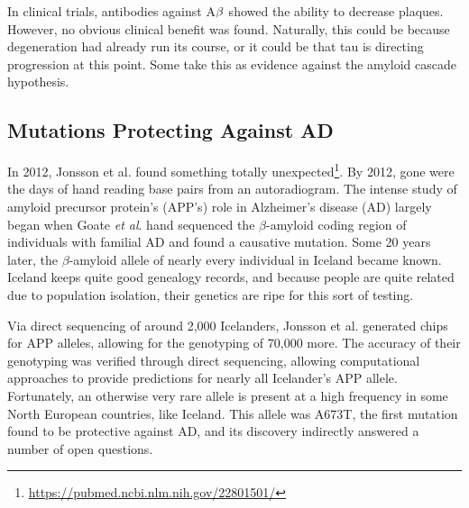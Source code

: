 In clinical trials, antibodies against A$\beta$ showed the ability to decrease plaques. However, no obvious clinical benefit was found. Naturally, this could be because degeneration had already run its course, or it could be that tau is directing progression at this point. Some take this as evidence against the amyloid cascade hypothesis. 


\subsection*{Mutations Protecting Against AD}

 In 2012, Jonsson et al. found something totally unexpected\footnote{\url{https://pubmed.ncbi.nlm.nih.gov/22801501/}}. By 2012, gone were the days of hand reading base pairs from an autoradiogram. The intense study of amyloid precursor protein's (APP's) role in Alzheimer's disease (AD) largely began when Goate \textit{et al}. hand sequenced the $\beta$-amyloid coding region of individuals with familial AD and found a causative mutation. Some 20 years later, the $\beta$-amyloid allele of nearly every individual in Iceland became known. Iceland keeps quite good genealogy records, and because people are quite related due to population isolation, their genetics are ripe for this sort of testing.\newline

Via direct sequencing of around 2,000 Icelanders, Jonsson et al. generated chips for APP alleles, allowing for the genotyping of 70,000 more. The accuracy of their genotyping was verified through direct sequencing, allowing computational approaches to provide predictions for nearly all Icelander's APP allele. Fortunately, an otherwise very rare allele is present at a high frequency in some North European countries, like Iceland. This allele was A673T, the first mutation found to be protective against AD, and its discovery indirectly answered a number of open questions. \newline

